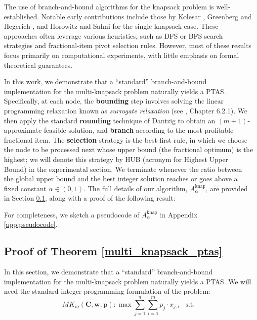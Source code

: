 \documentclass[moor,sglanonrev]{informs4}
\theoremstyle{plain}
\begin{document}
The use of branch-and-bound algorithms for the knapsack problem is well-established. Notable early contributions include those by Kolesar \cite{kolesar}, Greenberg and Hegerich \cite{greenberg_hegerich}, and Horowitz and Sahni \cite{horowitz_sahni_knapsack} for the single-knapsack case. These approaches often leverage various heuristics, such as DFS or BFS search strategies and fractional-item pivot selection rules. However, most of these results focus primarily on computational experiments, with little emphasis on formal theoretical guarantees.

In this work, we demonstrate that a ``standard'' branch-and-bound implementation for the multi-knapsack problem naturally yields a PTAS. Specifically, at each node, the \textbf{bounding} step involves solving the linear programming relaxation known as \emph{surrogate relaxation} (see \cite{martello_toth}, Chapter 6.2.1). 
%
We then apply the standard \textbf{rounding} technique of Dantzig \cite{dantzig} to obtain an $(m+1)$-approximate feasible solution, and \textbf{branch} according to the most profitable fractional item. The \textbf{selection} strategy is the best-first rule, in which we choose the node to be processed next whose upper bound (the fractional optimum) is the highest; we will denote this strategy by HUB (acronym for Highest Upper Bound) in the experimental section. We terminate whenever the ratio between the global upper bound and the best integer solution reaches or goes above a fixed constant $\alpha\in (0,1)$. The full details of our algorithm, \( A^{\text{knap}}_{\alpha} \), are provided in Section \ref{sec:knap_proof}, along with a proof of the following result:

\mk

For completeness, we sketch a pseudocode of $A^{\text{knap}}_{\alpha}$ in Appendix \ref{app:pseudocode}.

\subsection{Proof of Theorem \ref{multi_knapsack_ptas}}\label{sec:knap_proof}

In this section, we demonstrate that a ``standard'' branch-and-bound implementation for the multi-knapsack problem naturally yields a PTAS. We will need the standard integer programming formulation of the problem:
\begin{equation}\label{knapsack_ip}
    MK_m(\bm{C}, \bm{w}, \bm{p}) : \max \sum\limits_{j=1}^n \sum\limits_{i = 1}^m p_j \cdot x_{j,i} \,\,\, \text{ s.t.}
\end{equation}
\end{document}
